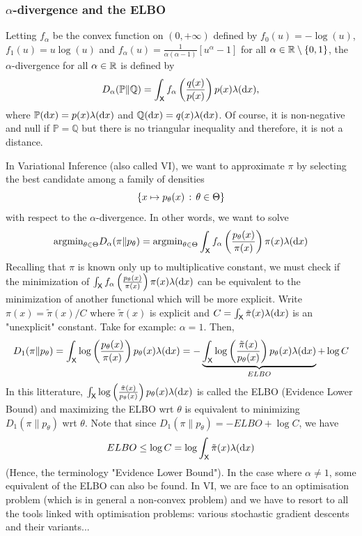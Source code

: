 \documentclass[english,graybox,envcountchap,envcountsame,sectrefs,shortlabels]{svmono}
\theoremstyle{style}
\newcommand{\eqsp}{}
\begin{document}
\subsubsection{$\alpha$-divergence and the ELBO}
Letting $f_\alpha$ be the convex function on $(0, +\infty)$ defined by $f_0(u) = -\log(u)$, $f_1(u) = u\log(u)$ and $f_\alpha(u) = \frac{1}{\alpha(\alpha-1)} \left[  u^\alpha -1 \right]$ for all $\alpha \in \mathbb{R} \setminus \left\{ 0,1\right\}$, the $\alpha$-divergence for all $\alpha \in \mathbb{R}$ is defined by
\begin{align}\label{eq:gen:div}
D_\alpha(\mathbb{P}\|\mathbb{Q}) = \int_\Xset f_\alpha\left(\frac{q(x)}{p(x)} \right)p(x) \lambda(\rmd x) \eqsp,
\end{align}
where $\mathbb{P}(\mathrm{d} x)=p(x)\lambda(\mathrm{d} x)$ and $\mathbb{Q}(\mathrm{d} x)=q(x) \lambda(\mathrm{d} x)$. Of course, it is non-negative and null if $\mathbb{P}=\mathbb{Q}$ but there is no triangular inequality and therefore, it is not a distance.



\newcommand{\argmin}{\mathrm{argmin}}
In Variational Inference (also called VI), we want to approximate $\pi$ by selecting the best candidate among a family of densities
$$
\left\{ x\mapsto p_\theta(x)\,:\,\theta\in\Theta\right\}
$$
with respect to the $\alpha$-divergence. In other words, we want to solve
$$
\argmin_{\theta\in\Theta} D_\alpha(\pi \| p_\theta)= \argmin_{\theta\in\Theta} \int_{\Xset} f_\alpha\lr{\frac{p_\theta(x)}{\pi(x)}} \pi(x) \lambda(\rmd x)
$$
Recalling that $\pi$ is known only up to multiplicative constant, we must check if the minimization of $\int_{\mathsf{X}} f_\alpha\left(\frac{p_\theta(x)}{\pi(x)}\right) \pi(x) \lambda(\mathrm{d} x)$ can be equivalent to the minimization of another functional which will be more explicit. Write $\pi(x)=\tilde \pi(x)/C$ where $\tilde \pi(x)$ is explicit and $C=\int_{\mathsf{X}} \tilde \pi(x)\lambda(\mathrm{d} x)$ is an "unexplicit" constant. Take for example: $\alpha=1$. Then,
$$
D_1(\pi \| p_\theta)= \int_{\mathsf{X}} \log\left(\frac{p_\theta(x)}{\pi(x)}\right) p_\theta(x) \lambda(\mathrm{d} x)=-\underbrace{\int_{\mathsf{X}} \log\left(\frac{\tilde \pi(x)}{p_\theta(x)}\right) p_\theta(x) \lambda(\mathrm{d} x)}_{ELBO} + \log C
$$
In this litterature, $\int_{\mathsf{X}} \log\left(\frac{\tilde \pi(x)}{p_\theta(x)}\right) p_\theta(x) \lambda(\mathrm{d} x)$ is called the ELBO (Evidence Lower Bound) and maximizing the ELBO wrt $\theta$ is equivalent to minimizing $ D_1(\pi \| p_\theta)$ wrt $\theta$. Note that
since $D_1(\pi \| p_\theta)=-ELBO+ \log C$, we have
$$
ELBO \leq \log C=\log \int_{\mathsf{X}} \tilde \pi(x)\lambda(\mathrm{d} x)
$$
(Hence, the terminology "Evidence Lower Bound"). In the case where $\alpha \neq 1$, some equivalent of the ELBO can also be found. In VI, we are face to an optimisation problem (which is in general a non-convex problem) and we have to resort to all the tools linked with optimisation problems: various stochastic gradient descents and their variants...
\end{document}
